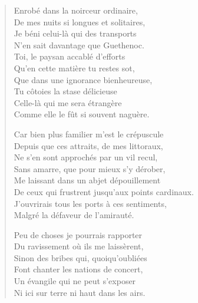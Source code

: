 \begin{verse}\dizain\huitain\sizain\neuvain\quintil\septain\quatrain
  Enrobé dans la noirceur ordinaire,\\  %
  De mes nuits si longues et solitaires,\\   %
  Je béni celui-là qui des transports\\   %
  N’en sait davantage que Guethenoc.\\   %
  Toi, le paysan accablé d’efforts\\   %
  Qu’en cette matière tu restes sot,\\   %
  Que dans une ignorance bienheureuse,\\   %
  Tu côtoies la stase délicieuse\\   %
  Celle-là qui me sera étrangère\\   %
  Comme elle le fût si souvent naguère. 

  Car bien plus familier m’est le crépuscule\\   %
  Depuis que ces attraits, de mes littoraux,\\  %
  Ne s’en sont approchés par un vil recul,\\  %
  Sans amarre, que pour mieux s’y dérober,\\  %
  Me laissant dans un abjet dépouillement\\  %
  De ceux qui frustrent jusqu’aux points cardinaux. \\ 
  J’ouvrirais tous les ports à ces sentiments,\\  %
  Malgré la défaveur de l’amirauté. 

  Peu de choses je pourrais rapporter\\  %
  Du ravissement où ils me laissèrent,\\  %
  Sinon des bribes qui, quoiqu’oubliées\\  %
  Font chanter les nations de concert,\\  %
  Un évangile qui ne peut s’exposer\\  %
  Ni ici sur terre ni haut dans les airs. 


\end{verse}
